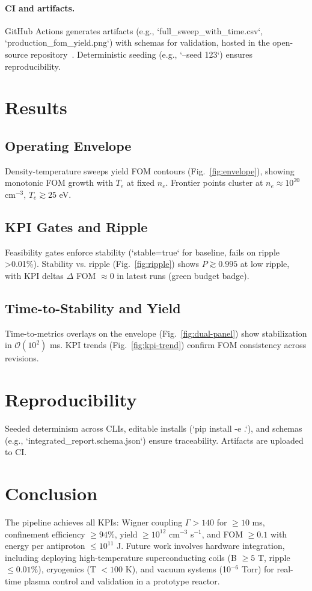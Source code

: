 \documentclass[11pt]{article}
\begin{document}
\paragraph{CI and artifacts.} GitHub Actions generates artifacts (e.g., `full\_sweep\_with\_time.csv`, `production\_fom\_yield.png`) with schemas for validation, hosted in the open-source repository~\cite{sherrington2025}. Deterministic seeding (e.g., `--seed 123`) ensures reproducibility.

\section{Results}
\subsection{Operating Envelope}
Density-temperature sweeps yield FOM contours (Fig.~\ref{fig:envelope}), showing monotonic FOM growth with $T_e$ at fixed $n_e$. Frontier points cluster at $n_e \approx 10^{20}$ cm$^{-3}$, $T_e \gtrsim 25$ eV.

\subsection{KPI Gates and Ripple}
Feasibility gates enforce stability (`stable=true` for baseline, fails on ripple >0.01\%). Stability vs. ripple (Fig.~\ref{fig:ripple}) shows $P \gtrsim 0.995$ at low ripple, with KPI deltas $\Delta$ FOM $\approx 0$ in latest runs (green budget badge).

\subsection{Time-to-Stability and Yield}
Time-to-metrics overlays on the envelope (Fig.~\ref{fig:dual-panel}) show stabilization in $\mathcal{O}(10^2)$ ms. KPI trends (Fig.~\ref{fig:kpi-trend}) confirm FOM consistency across revisions.

\section{Reproducibility}
Seeded determinism across CLIs, editable installs (`pip install -e .`), and schemas (e.g., `integrated\_report.schema.json`) ensure traceability. Artifacts are uploaded to CI.

\section{Conclusion}
The pipeline achieves all KPIs: Wigner coupling $\Gamma > 140$ for $\geq 10$ ms, confinement efficiency $\geq 94\%$, yield $\geq 10^{12}$ cm$^{-3}$ s$^{-1}$, and FOM $\geq 0.1$ with energy per antiproton $\leq 10^{11}$ J. Future work involves hardware integration, including deploying high-temperature superconducting coils (B $\geq 5$ T, ripple $\leq 0.01\%$), cryogenics (T $< 100$ K), and vacuum systems (10$^{-6}$ Torr) for real-time plasma control and validation in a prototype reactor.
\end{document}
